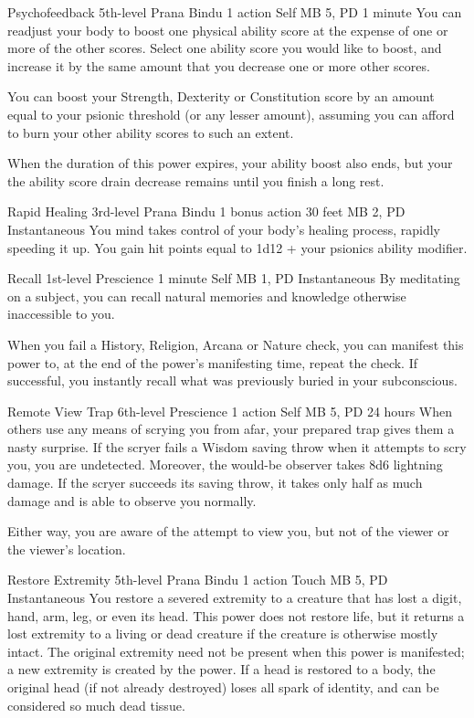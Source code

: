 \DndPowerHeader%
  {Psychofeedback}
  {5th-level Prana Bindu}
  {1 action}
  {Self}
  {MB 5, PD \lvlfive}
  {1 minute}
  You can readjust your body to boost one
  physical ability score at the expense of one
  or more of the other scores.
  Select one ability score you would like to boost,
  and increase it by the same amount that you decrease
  one or more other scores.

  You can boost your
  Strength, Dexterity or Constitution score by an
  amount equal to your psionic threshold
  (or any lesser amount),
  assuming you can afford to burn your other ability
  scores to such an extent.
  
  When the duration of this power expires,
  your ability boost also ends,
  but your the ability score drain decrease
  remains until you finish a long rest.

\DndPowerHeader%
  {Rapid Healing}
  {3rd-level Prana Bindu}
  {1 bonus action}
  {30 feet}
  {MB 2, PD \lvlthree}
  {Instantaneous}
You mind takes control of your body's healing process,
rapidly speeding it up.
You gain hit points equal to 1d12 + your psionics ability modifier.

\DndPowerHeader%
  {Recall}
  {1st-level Prescience}
  {1 minute}
  {Self}
  {MB 1, PD \lvlone}
  {Instantaneous}
By meditating on a subject, you can recall
natural memories and knowledge otherwise inaccessible to you.

When you fail a History, Religion, Arcana or Nature check,
you can manifest this power to, at the end of the
power's manifesting time, repeat the check.
If successful, you instantly recall
what was previously buried in your subconscious.

\DndPowerHeader%
  {Remote View Trap}
  {6th-level Prescience}
  {1 action}
  {Self}
  {MB 5, PD \lvlsix}
  {24 hours}
  When others use any means of scrying you from afar,
  your prepared trap gives them a nasty surprise.
  If the scryer fails a Wisdom saving throw
  when it attempts to scry you,
  you are undetected.
  Moreover, the would-be observer takes 8d6 lightning damage.
  If the scryer succeeds its saving throw,
  it takes only half as much damage
  and is able to observe you normally.
  
  Either way, you are aware of the attempt to view you,
  but not of the viewer or the viewer's location.

\DndPowerHeader%
  {Restore Extremity}
  {5th-level Prana Bindu}
  {1 action}
  {Touch}
  {MB 5, PD \lvlfive}
  {Instantaneous}
  You restore a severed extremity to a creature that has
  lost a digit,
  hand,
  arm,
  leg,
  or even its head.
  This power does not restore life,
  but it returns a lost extremity to a living or dead creature
  if the creature is otherwise mostly intact.
  The original extremity need not be present
  when this power is manifested;
  a new extremity is created by the power.
  If a head is restored to a body,
  the original head (if not already destroyed)
  loses all spark of identity,
  and can be considered so much dead tissue.

